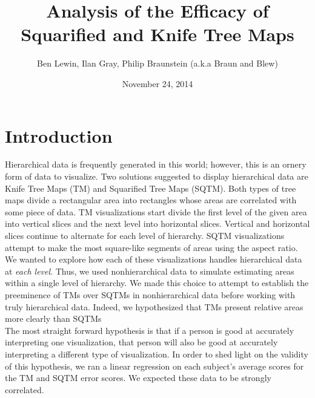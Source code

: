 \documentclass{article}
\title{Analysis of the Efficacy of Squarified and Knife Tree Maps}
\author{Ben Lewin, Ilan Gray, Philip Braunstein (a.k.a Braun and Blew)}
\date{November 24, 2014}
\begin{document}
\maketitle
{}

\section*{Introduction}
Hierarchical data is frequently generated in this world; however, this is an ornery form of data to visualize. Two solutions
suggested to display hierarchical data are Knife Tree Maps (TM) and Squarified Tree Maps (SQTM). Both types of tree maps divide a rectangular area into rectangles whose areas are correlated with some piece of data. TM visualizations
start divide the first level of the given area into vertical slices and the next level into horizontal slices. Vertical and horizontal
slices continue to alternate for each level of hierarchy. SQTM visualizations attempt to make the most square-like segments
of areas using the aspect ratio.\\

We wanted to explore how each of these visualizations handles hierarchical data at \emph{each level}. Thus, we used
nonhierarchical data to simulate estimating areas within a single level of hierarchy. We made this choice to attempt to establish the preeminence  of TMs over SQTMs in nonhierarchical data before working with truly hierarchical data. Indeed, we hypothesized that TMs present relative areas more clearly than SQTMs\\

The most straight forward hypothesis is that if a person is good at accurately interpreting one visualization, that person will
also be good at accurately interpreting a different type of visualization. In order to shed light on the validity of this hypothesis,
we ran a linear regression on each subject's average scores for the TM and SQTM error scores. We expected these data to be
strongly correlated.
\end{document}
